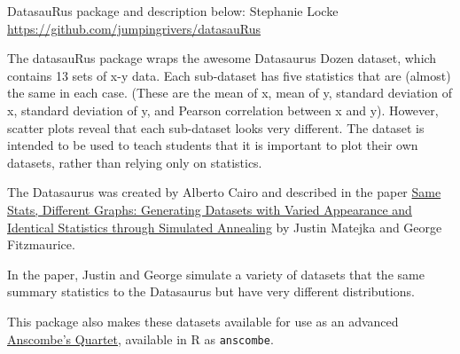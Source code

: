 \documentclass[
]{article}
\begin{document}
DatasauRus package and description below: Stephanie Locke
\url{https://github.com/jumpingrivers/datasauRus}

The datasauRus package wraps the awesome Datasaurus Dozen dataset, which
contains 13 sets of x-y data. Each sub-dataset has five statistics that
are (almost) the same in each case. (These are the mean of x, mean of y,
standard deviation of x, standard deviation of y, and Pearson
correlation between x and y). However, scatter plots reveal that each
sub-dataset looks very different. The dataset is intended to be used to
teach students that it is important to plot their own datasets, rather
than relying only on statistics.

The Datasaurus was created by Alberto Cairo and described in the paper
\href{https://www.autodeskresearch.com/publications/samestats}{Same
Stats, Different Graphs: Generating Datasets with Varied Appearance and
Identical Statistics through Simulated Annealing} by Justin Matejka and
George Fitzmaurice.

In the paper, Justin and George simulate a variety of datasets that the
same summary statistics to the Datasaurus but have very different
distributions.

This package also makes these datasets available for use as an advanced
\href{https://en.wikipedia.org/wiki/Anscombe\%27s_quartet}{Anscombe's
Quartet}, available in R as \texttt{anscombe}.
\end{document}

